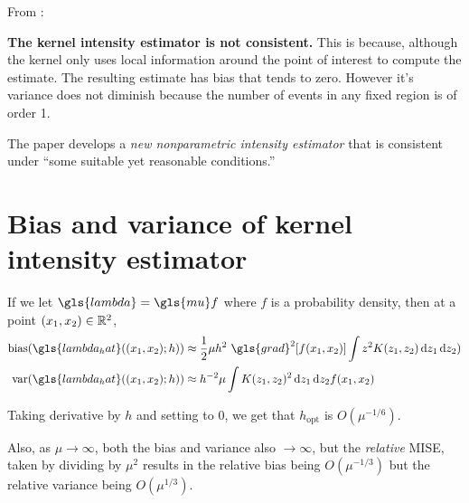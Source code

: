 From \citet{guan2008consistent}:

{
\color{red}
\textbf{The kernel intensity estimator is not consistent.}
This is because, although the kernel only uses local information around the point of interest to compute the estimate.
The resulting estimate has bias that tends to zero.
However it's variance does not diminish because the number of events in any fixed region is of order 1.
}

The paper develops a \textit{new nonparametric intensity estimator} that is consistent under ``some suitable yet reasonable conditions.''

%
%
\section{Bias and variance of kernel intensity estimator}

If we let \(\gls{lambda} = \gls{mu} f\) where \(f\) is a probability density, then at a point \((x_1, x_2) \in \mathbb{R}^2\),
\begin{align}
    \mbox{bias}(\gls{lambda_hat}((x_1, x_2);h)) & \approx
        \frac{1}{2} \mu h^2 ~ \gls{grad}^2\!\left[ f(x_1, x_2) \right]
            \int { z^2 K(z_1, z_2) \diff{z_1} \diff{z_2)} } \\
    \mbox{var}(\gls{lambda_hat}((x_1, x_2);h)) & \approx
        h^{-2} \mu
            \int { K(z_1, z_2)^2\diff{z_1} \diff{z_2} } f(x_1, x_2)
\end{align}

Taking derivative by \(h\) and setting to \(0\), we get that \(h_{\mbox{opt}}\) is \(O(\mu^{-1/6})\).

Also, as \(\mu \to \infty\), both the bias and variance also \(\to \infty\),
but the \textit{relative} MISE, taken by dividing by \(\mu^2\) results in the relative bias being \(O(\mu^{-1/3})\)
but the relative variance being \(O(\mu^{1/3})\).



